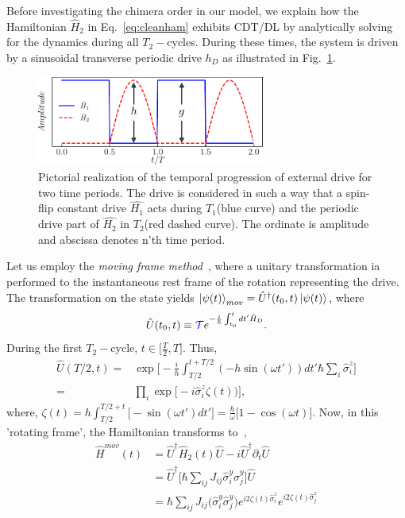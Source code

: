\documentclass[%
nofootinbib,
reprint,
superscriptaddress,
amsmath,amssymb,showkeys,
aps,
prb,
]{revtex4-2}
\newcommand{\blue}[1]{\textcolor{blue}{#1}}
\begin{document}
	Before investigating the chimera order in our model, we explain how the Hamiltonian $\hat{H}_2$ in Eq.~\eqref{eq:cleanham} exhibits CDT/DL by analytically solving for the dynamics during all $T_2-$cycles. During these times,  the system is driven by a sinusoidal transverse periodic drive $h_D$ as illustrated in Fig.~\ref{Fig:time_distribution}.
	\begin{figure}
		\begin{center}
			\includegraphics[width=7.5cm]{drive_distribution.pdf}
		\end{center}
		\caption[]{Pictorial realization of the temporal progression of external drive for two time periods. The drive is considered in such a way that a spin-flip constant drive $\hat{H_1}$ acts during $T_1$(blue curve) and the periodic drive part of $\hat{H_2}$ in $T_2$(red dashed curve). The ordinate is amplitude and abscissa denotes n'th time period.}
		\label{Fig:time_distribution}
	\end{figure}	
	Let us employ the \textit{moving frame method}~\cite{haldar_dynamical_2021}, where a unitary transformation ia performed to the instantaneous rest frame of the rotation representing the drive. The transformation on the state yields $\ket{\psi(t)}_{mov} = \hat{U}^\dagger(t_0,t) \ket{\psi(t)}$, where 
	\begin{equation}
		\hat{U}(t_0,t) \equiv \blue{\mathcal{T}} e^{-\frac{i}{\hbar}\int_{t_0}^{t} dt' \hat{H}_D}.
		\label{eq:rot1}
	\end{equation}
	During the first $T_2-$cycle, $t \in{\Big[\frac{T}{2}, T \Big]}$. Thus,
	\begin{align}
		\hat{U}\left(T/2,t\right) =& \exp \Bigg[-\frac{i}{\hbar}\int_{T/2}^{t+T/2} (-h \sin(\omega t'))dt'\hbar\sum_i\hat{\sigma}^z_i\Bigg]\nonumber\\
		=& \prod_{i} \exp\Big[-i \hat{\sigma}^z_i\zeta(t))\Big],
	\end{align}	
	where, $\displaystyle{
		\zeta (t) = h\int_{T/2}^{T/2+t}  \Big[-\sin(\omega t')dt'\Big]=  \frac{h}{\omega}\Big[1-\cos(\omega t)\Big]}$.		
	Now, in this 'rotating frame', the Hamiltonian transforms to~\cite{haldar_dynamical_2021},
	\begin{align}
		\hat{H}^{mov}(t) &= \hat{U}^\dagger \hat{H}_2(t) \hat{U}- i \hat{U}^\dagger \partial_t \hat{U}\nonumber\\
		&= \hat{U}^\dagger \big[\hbar\sum_{ij}J_{ij}\hat{\sigma}^y_i\hat{\sigma}^y_j\big] \hat{U}\nonumber\\
		&=\hbar\sum_{ij} J_{ij} \Big(\hat{\sigma}^y_i\hat{\sigma}^y_j\Big) e^{i 2\zeta(t) \hat{\sigma}^z_i}  e^{i 2\zeta(t) \hat{\sigma}^z_j}
		\label{eq:movham}
	\end{align}
\end{document}
